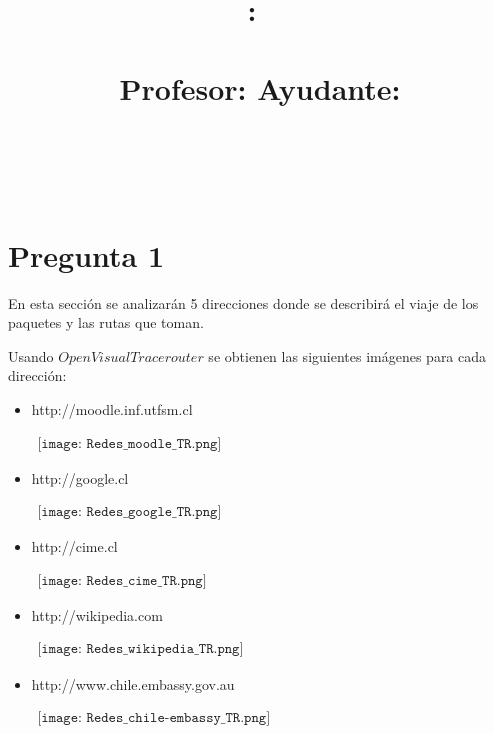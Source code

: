 \documentclass{article}
\title{
\textmd{\textbf{\tareaRamo:\ \tareaTitulo}}\\
\normalsize\vspace{0.1in}\small{\tareaFecha}\\
\vspace{0.1in}\large{Profesor: \textit{\tareaProfesor} \qquad \qquad Ayudante: \textit{\tareaAyudante}}
}
\author{
    \textbf{\tareaAlumnoUno} \\
    \small{\tareaRolUno}
    \and
    \textbf{\tareaAlumnoDos} \\
    \small{\tareaRolDos}}
\date{}
\begin{document}
\maketitle

\section{Pregunta 1}	

En esta secci\'on se analizar\'an 5 direcciones donde se describir\'a el viaje de los paquetes y las rutas que toman.

Usando $Open Visual Tracerouter$ se obtienen las siguientes im\'agenes para cada direcci\'on:

\begin{itemize}
\item http://moodle.inf.utfsm.cl\\

\begin{center}$
\begin{array}{c}
\texttt{[image: Redes\_moodle\_TR.png]}
\end{array}$
\end{center}

\item http://google.cl\\

\begin{center}$
\begin{array}{c}
\texttt{[image: Redes\_google\_TR.png]}
\end{array}$
\end{center}

\item http://cime.cl\\

\begin{center}$
\begin{array}{c}
\texttt{[image: Redes\_cime\_TR.png]}
\end{array}$
\end{center}

\item http://wikipedia.com\\

\begin{center}$
\begin{array}{c}
\texttt{[image: Redes\_wikipedia\_TR.png]}
\end{array}$
\end{center}

\item http://www.chile.embassy.gov.au\\

\begin{center}$
\begin{array}{c}
\texttt{[image: Redes\_chile-embassy\_TR.png]}
\end{array}$
\end{center}

\end{itemize}
\end{document}
